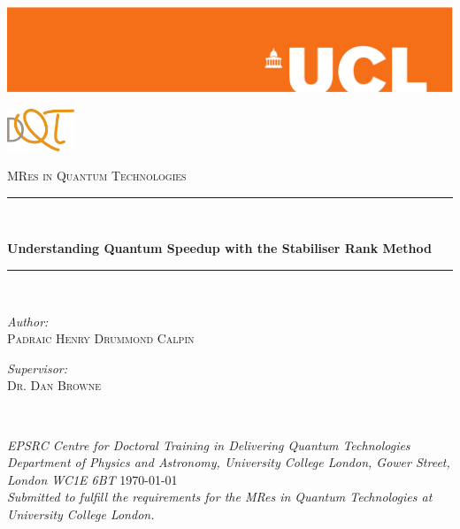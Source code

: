 \newcommand{\HRule}{\rule{\linewidth}{0.5mm}}
\begin{titlepage}
\begin{center}
\includegraphics[width=\hsize]{Figures/orange-eps-converted-to}
\\[3cm]
\end{center}
\begin{flushright}
	\includegraphics[width=0.15\textwidth]{Figures/DQT-LOGO.png}
\end{flushright}
\vspace{-15pt}
\textsc{\large MRes in Quantum Technologies}
\\[1cm]
\HRule \\[0.5cm]
\begin{center}
	\textsf{\huge \bfseries Understanding Quantum Speedup with the Stabiliser Rank Method} \\
\end{center}
\HRule \\[1cm]
\begin{minipage}{0.5\textwidth}
	\begin{flushleft}
		\emph{Author:} \\
		\textsc{Padraic Henry Drummond Calpin} \\[0.4cm]	
	\end{flushleft}
\end{minipage}
\begin{minipage}{0.5\textwidth}
	\begin{flushright}
		\emph{Supervisor:} \\
		\textsc{Dr. Dan Browne} \\[0.4cm]
	\end{flushright}
\end{minipage} \\[1cm]
\begin{center}
	\emph{EPSRC Centre for Doctoral Training in Delivering Quantum Technologies\\ Department of Physics and Astronomy, University College London, Gower Street, London WC1E 6BT}
\vfill
\large \today\\[1.5cm]
	\emph{Submitted to fulfill the requirements for the MRes in Quantum Technologies at University College London.}
\end{center}
\end{titlepage}